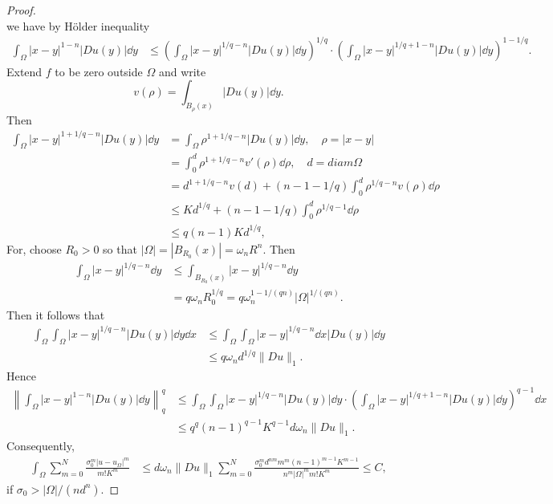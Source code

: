 \begin{proof}
\[	\]
	we have by H\"older inequality
	\begin{align*}
		\int_\Omega |x-y|^{1-n}|Du(y)|\dd y
			&\leq \left(\int_\Omega|x-y|^{1/q-n}|Du(y)|\dd y\right)^{1/q}
				\cdot \left(\int_\Omega |x-y|^{1/q+1-n}|Du(y)|\dd y\right)^{1-1/q}.
	\end{align*}
	Extend $f$ to be zero outside $\Omega$ and write
	\[
		v(\rho) = \int_{B_\rho(x)}|Du(y)|\dd y.
	\]
	Then 
	\begin{align*}
		\int_\Omega|x-y|^{1+1/q-n}|Du(y)|\dd y 
			&= \int_\Omega \rho^{1+1/q-n}|Du(y)|\dd y,\quad \rho = |x-y|\\
			&= \int_0^d\rho^{1+1/q-n}v'(\rho)\dd\rho,\quad d=diam \Omega\\
			&= d^{1+1/q-n}v(d) + (n-1-1/q)\int_0^d\rho^{1/q-n}v(\rho)\dd\rho\\
			&\leq Kd^{1/q} + (n-1-1/q)\int_0^d\rho^{1/q-1}\dd\rho\\
			&\leq q(n-1)Kd^{1/q},
	\end{align*}
	For, choose $R_0>0$ so that $|\Omega| = |B_{R_0}(x)| = \omega_nR^n$. Then
	\begin{align*}
		\int_\Omega |x-y|^{1/q-n}\dd y 
			&\leq \int_{B_{R_0}(x)}|x-y|^{1/q-n}\dd y\\
			&= q\omega_nR_0^{1/q} = q\omega_n^{1-1/(qn)}|\Omega|^{1/(qn)}.
	\end{align*}
	Then it follows that %
	\begin{align*}
		\int_\Omega\int_\Omega|x-y|^{1/q-n}|Du(y)|\dd y \dd x 
		 &\leq \int_\Omega\int_\Omega |x-y|^{1/q-n}\dd x |Du(y)|\dd y\\
		 &\leq q\omega_nd^{1/q}\|Du\|_1.
	\end{align*}
	Hence 
	\begin{align*}
		\left\|\int_\Omega |x-y|^{1-n}|Du(y)|\dd y\right\|_q^q
			&\leq \int_\Omega\int_\Omega|x-y|^{1/q-n}|Du(y)|\dd y
			\cdot \left(\int_\Omega |x-y|^{1/q+1-n}|Du(y)|\dd y\right)^{q-1}\dd x\\
			&\leq q^q(n-1)^{q-1}K^{q-1}d\omega_n\|Du\|_1.
	\end{align*}
	Consequently,
	\begin{align*}
		\int_\Omega\sum_{m=0}^N \frac{\sigma_0^m|u-u_\Omega|^m}{m!K^m}
			&\leq d\omega_n\|Du\|_1 \sum_{m=0}^N \frac{\sigma_0^md^{nm}m^m(n-1)^{m-1}K^{m-1}}{n^m|\Omega|^mm!K^m}
			\leq C,
	\end{align*}
	if $\sigma_0>|\Omega|/(nd^n)$.
\end{proof}

